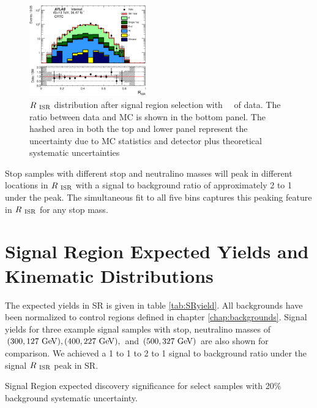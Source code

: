 \begin{figure}[htbp]
  \begin{center}
     \includegraphics[width=0.45\textwidth]{figures/ttbar/postfit/CA_RISR_CRTopC_log}
  \end{center}
  \caption{ $R_{~\mathrm{ISR}}$ distribution after signal region selection with \intlumi\ \ifb\ of data. The ratio between data and MC is shown in the bottom panel. The hashed area in both the top and lower panel represent the uncertainty due to MC statistics and detector plus theoretical systematic uncertainties}
  \label{fig:SR:RISR}
\end{figure}

\indent Stop samples with different stop and neutralino masses will peak in different locations in $R_{~\mathrm{ISR}}$ with a signal to background ratio of approximately 2 to 1 under the peak.  The simultaneous fit to all five bins captures this peaking feature in $R_{~\mathrm{ISR}}$ for any stop mass.  \\

\section{Signal Region Expected Yields and Kinematic Distributions}
\label{sec:SR:Yields}

\indent The expected yields in SR is given in table \ref{tab:SRyield}.  All backgrounds have been normalized to control regions defined in chapter \ref{chap:backgrounds}.  Signal yields for three example signal samples with stop, neutralino masses of $(300,127 \gev), (400,227\gev), $ and $(500,327 \gev)$ are also shown for comparison.  We achieved a 1 to 1 to 2 to 1 signal to background ratio under the signal $R_{~\mathrm{ISR}}$ peak in SR. \\

\begin{table}
  \begin{center}
    \def\arraystretch{1.4}%
    
    
    
    
    
  \end{center}
  \caption{Signal Region expected discovery significance for select samples with 20\% background systematic uncertainty.}
  \label{tab:SRyield}
\end{table}

